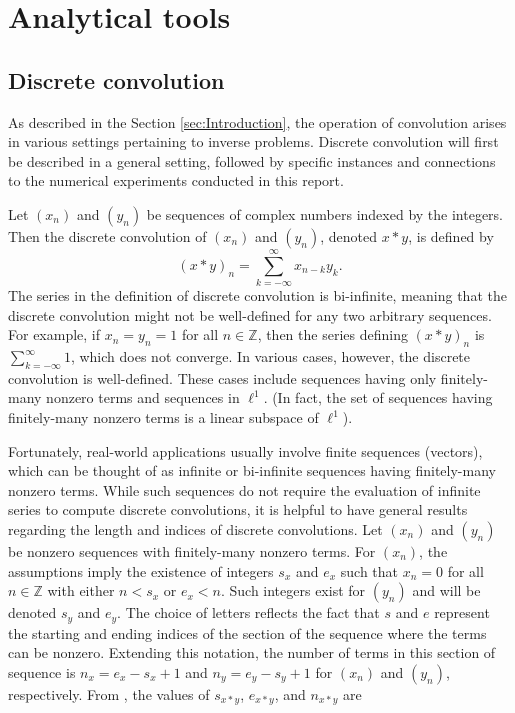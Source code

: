 \documentclass[12pt]{article}
\begin{document}
\section{Analytical tools} \label{sec:Analytical tools}

\subsection{Discrete convolution} \label{sec:Discrete convolution}
As described in the Section \ref{sec:Introduction}, the operation of convolution arises in various settings pertaining to inverse problems. Discrete convolution will first be described  in a general setting, followed by specific instances and connections to the numerical experiments conducted in this report. \par
Let $(x_n)$ and $(y_n)$ be sequences of complex numbers indexed by the integers. Then the discrete convolution of $(x_n)$ and $(y_n)$, denoted $x*y$, is defined by
\[(x*y)_n = \sum_{k=-\infty}^\infty x_{n-k}y_k.\]
The series in the definition of discrete convolution is bi-infinite, meaning that the discrete convolution might not be well-defined for any two arbitrary sequences. For example, if $x_n = y_n = 1$ for all $n \in \mathbb{Z}$, then the series defining $(x*y)_n$ is $\sum_{k=-\infty}^\infty 1$, which does not converge. In various cases, however, the discrete convolution is well-defined. These cases include sequences having only finitely-many nonzero terms and sequences in $\ell^1$. (In fact, the set of sequences having finitely-many nonzero terms is a linear subspace of $\ell^1$).  \par 
Fortunately, real-world applications usually involve finite sequences (vectors), which can be thought of as infinite or bi-infinite sequences having finitely-many nonzero terms. While such sequences do not require the evaluation of infinite series to compute discrete convolutions, it is helpful to have general results regarding the length and indices of discrete convolutions. Let $(x_n)$ and $(y_n)$ be nonzero sequences with finitely-many nonzero terms. For $(x_n)$, the assumptions imply the existence of integers $s_x$ and $e_x$ such that $x_n = 0$ for all $n \in \mathbb{Z}$ with either $n < s_x$ or $e_x < n$. Such integers exist for $(y_n)$ and will be denoted $s_y$ and $e_y$. The choice of letters reflects the fact that $s$ and $e$ represent the starting and ending indices of the section of the sequence where the terms can be nonzero. Extending this notation, the number of terms in this section of sequence is $n_x = e_x - s_x + 1$ and $n_y = e_y - s_y + 1$ for $(x_n)$ and $(y_n)$, respectively. From \cite{BoggessAlbert2001Afci}, the values of $s_{x*y}$, $e_{x*y}$, and $n_{x*y}$ are
\end{document}
